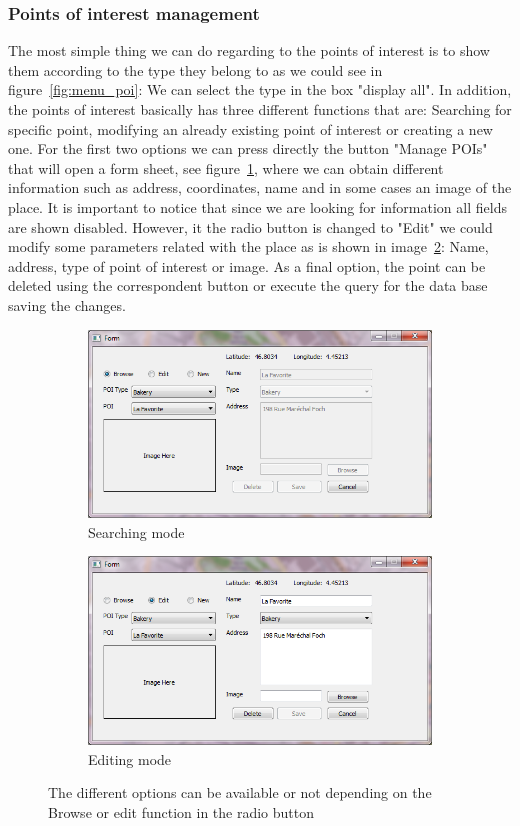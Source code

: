 \documentclass{article}
\begin{document}
\subsubsection{Points of interest management} \label{POI}
The most simple thing we can do regarding to the points of interest is to show them according to the type they belong to as we could see in figure~\ref{fig:menu_poi}: We can select the type in the box "display all". In addition, the points of interest basically has three different functions that are: Searching for specific point, modifying an already existing point of interest or creating a new one. For the first two options we can press directly the button "Manage POIs" that will open a form sheet, see figure~\ref{fig:sub1}, where we can obtain different information such as address, coordinates, name and in some cases an image of the place. It is important to notice that since we are looking for information all fields are shown disabled. However, it the radio button is changed to "Edit" we could modify some parameters related with the place as is shown in image~\ref{fig:sub2}: Name, address, type of point of interest or image. As a final option, the point can be deleted using the correspondent button or execute the query for the data base saving the changes.

\begin{figure}[h]
\centering
\begin{subfigure}{0.5\textwidth}
  \centering
  \includegraphics[width=.8\linewidth]{form.png}
  \caption{Searching mode}
  \label{fig:sub1}
\end{subfigure}%
\begin{subfigure}{0.5\textwidth}
  \centering
  \includegraphics[width=.8\linewidth]{form1.png}
  \caption{Editing mode}
  \label{fig:sub2}
\end{subfigure}
\caption{The different options can be available or not depending on the Browse or edit function in the radio button}
\label{fig:test}
\end{figure}
\end{document}
